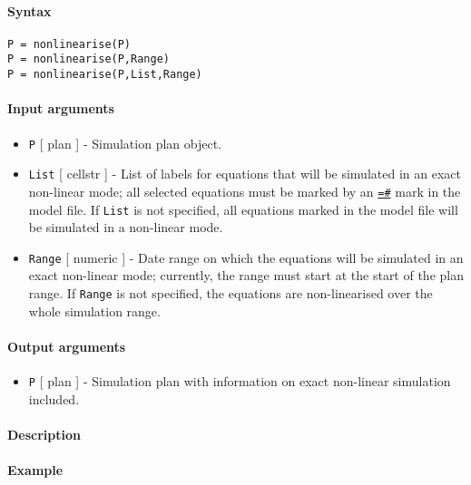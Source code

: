


	\paragraph{Syntax}

\begin{verbatim}
P = nonlinearise(P)
P = nonlinearise(P,Range)
P = nonlinearise(P,List,Range)
\end{verbatim}

\paragraph{Input arguments}

\begin{itemize}
\item
  \texttt{P} {[} plan {]} - Simulation plan object.
\item
  \texttt{List} {[} cellstr {]} - List of labels for equations that will
  be simulated in an exact non-linear mode; all selected equations must
  be marked by an \href{modellang/exactnonlin}{\texttt{=\#}} mark in the
  model file. If \texttt{List} is not specified, all equations marked in
  the model file will be simulated in a non-linear mode.
\item
  \texttt{Range} {[} numeric {]} - Date range on which the equations
  will be simulated in an exact non-linear mode; currently, the range
  must start at the start of the plan range. If \texttt{Range} is not
  specified, the equations are non-linearised over the whole simulation
  range.
\end{itemize}

\paragraph{Output arguments}

\begin{itemize}
\itemsep1pt\parskip0pt
\item
  \texttt{P} {[} plan {]} - Simulation plan with information on exact
  non-linear simulation included.
\end{itemize}

\paragraph{Description}

\paragraph{Example}


